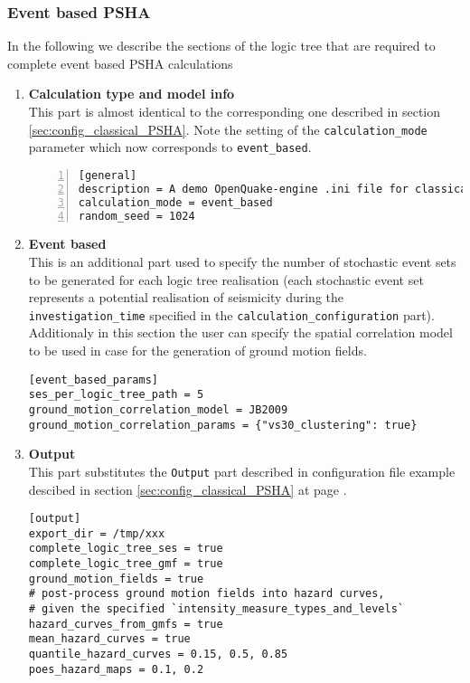 \subsubsection{Event based PSHA}
%
In the following we describe the sections of the logic tree that are 
required to complete event based PSHA calculations 
\begin{enumerate}
\item \textbf{Calculation type and model info} \hfill \\
    This part is almost identical to the corresponding one 
    described in section \ref{sec:config_classical_PSHA}. Note
    the setting of the \texttt{cal\-cu\-lation\_mode} parameter
    which now corresponds to \texttt{event\_based}.
\begin{Verbatim}[frame=single, commandchars=\\\{\}, fontsize=\small,
    numbers=left, numbersep=2pt]
[general]
description = A demo OpenQuake-engine .ini file for classical PSHA
calculation_mode = event_based
random_seed = 1024
\end{Verbatim}
%
\item \textbf{Event based} \hfill \\
This is an additional part used to specify the number of stochastic 
event sets to be generated for each logic tree realisation 
(each stochastic event set represents a potential realisation of seismicity
during the \texttt{in\-ves\-ti\-gation\_time} specified in the 
\texttt{calculation\_configuration} part).
Additionaly in this section the user can specify the spatial correlation
model to be used in case for the generation of ground motion fields. 
\begin{Verbatim}[frame=single, commandchars=\\\{\}, fontsize=\small]
[event_based_params]
ses_per_logic_tree_path = 5
ground_motion_correlation_model = JB2009
ground_motion_correlation_params = {"vs30_clustering": true}
\end{Verbatim}
%
\item \textbf{Output} \hfill \\
This part substitutes the \texttt{Output} part described in 
configuration file example descibed in section \ref{sec:config_classical_PSHA}
at page \pageref{sec:config_classical_PSHA}.
\begin{Verbatim}[frame=single, commandchars=\\\{\}, fontsize=\small]
[output]
export_dir = /tmp/xxx
complete_logic_tree_ses = true
complete_logic_tree_gmf = true
ground_motion_fields = true
# post-process ground motion fields into hazard curves,
# given the specified `intensity_measure_types_and_levels`
hazard_curves_from_gmfs = true
mean_hazard_curves = true
quantile_hazard_curves = 0.15, 0.5, 0.85
poes_hazard_maps = 0.1, 0.2
\end{Verbatim}
%
\end{enumerate}

